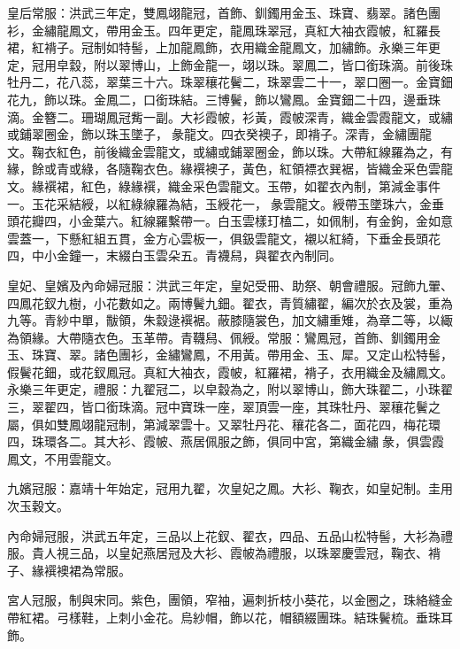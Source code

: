 皇后常服：洪武三年定，雙鳳翊龍冠，首飾、釧鐲用金玉、珠寶、翡翠。諸色團衫，金繡龍鳳文，帶用金玉。四年更定，龍鳳珠翠冠，真紅大袖衣霞帔，紅羅長裙，紅褙子。冠制如特髻，上加龍鳳飾，衣用織金龍鳳文，加繡飾。永樂三年更定，冠用皁縠，附以翠博山，上飾金龍一，翊以珠。翠鳳二，皆口銜珠滴。前後珠牡丹二，花八蕊，翠葉三十六。珠翠穰花鬢二，珠翠雲二十一，翠口圈一。金寶鈿花九，飾以珠。金鳳二，口銜珠結。三博鬢，飾以鸞鳳。金寶鈿二十四，邊垂珠滴。金簪二。珊瑚鳳冠觜一副。大衫霞帔，衫黃，霞帔深青，織金雲霞龍文，或繡或鋪翠圈金，飾以珠玉墜子，彖龍文。四衣癸襖子，即褙子。深青，金繡團龍文。鞠衣紅色，前後織金雲龍文，或繡或鋪翠圈金，飾以珠。大帶紅線羅為之，有緣，餘或青或綠，各隨鞠衣色。緣襈襖子，黃色，紅領褾衣巽裾，皆織金采色雲龍文。緣襈裙，紅色，綠緣襈，織金采色雲龍文。玉帶，如翟衣內制，第減金事件一。玉花采結綬，以紅綠線羅為結，玉綬花一，彖雲龍文。綬帶玉墜珠六，金垂頭花瓣四，小金葉六。紅線羅繫帶一。白玉雲樣玎榼二，如佩制，有金鉤，金如意雲蓋一，下懸紅組五貫，金方心雲板一，俱鈒雲龍文，襯以紅綺，下垂金長頭花四，中小金鐘一，末綴白玉雲朵五。青襪舄，與翟衣內制同。

皇妃、皇嬪及內命婦冠服：洪武三年定，皇妃受冊、助祭、朝會禮服。冠飾九翬、四鳳花釵九樹，小花數如之。兩博鬢九鈿。翟衣，青質繡翟，編次於衣及裳，重為九等。青紗中單，黻領，朱縠逯襈裾。蔽膝隨裳色，加文繡重雉，為章二等，以緅為領緣。大帶隨衣色。玉革帶。青韈舄、佩綬。常服：鸞鳳冠，首飾、釧鐲用金玉、珠寶、翠。諸色團衫，金繡鸞鳳，不用黃。帶用金、玉、犀。又定山松特髻，假鬢花鈿，或花釵鳳冠。真紅大袖衣，霞帔，紅羅裙，褙子，衣用織金及繡鳳文。永樂三年更定，禮服：九翟冠二，以皁縠為之，附以翠博山，飾大珠翟二，小珠翟三，翠翟四，皆口銜珠滴。冠中寶珠一座，翠頂雲一座，其珠牡丹、翠穰花鬢之屬，俱如雙鳳翊龍冠制，第減翠雲十。又翠牡丹花、穰花各二，面花四，梅花環四，珠環各二。其大衫、霞帔、燕居佩服之飾，俱同中宮，第織金繡彖，俱雲霞鳳文，不用雲龍文。

九嬪冠服：嘉靖十年始定，冠用九翟，次皇妃之鳳。大衫、鞠衣，如皇妃制。圭用次玉穀文。

內命婦冠服，洪武五年定，三品以上花釵、翟衣，四品、五品山松特髻，大衫為禮服。貴人視三品，以皇妃燕居冠及大衫、霞帔為禮服，以珠翠慶雲冠，鞠衣、褙子、緣襈襖裙為常服。

宮人冠服，制與宋同。紫色，團領，窄袖，遍刺折枝小葵花，以金圈之，珠絡縫金帶紅裙。弓樣鞋，上刺小金花。烏紗帽，飾以花，帽額綴團珠。結珠鬢梳。垂珠耳飾。

